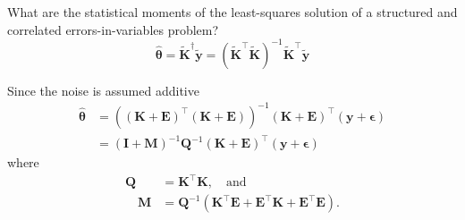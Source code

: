 \documentclass[presentation]{beamer}
\begin{document}
\begin{frame}[label={slide:statistical1}]{What are the statistical moments of the least-squares solution of a structured and correlated errors-in-variables problem?}
\begin{equation*} \widehat{\bm{\theta}} = \widetilde{\mathbf{K}}^\dagger \widetilde{\mathbf{y}} = ( \widetilde{\mathbf{K}}^\top \widetilde{\mathbf{K}} )^{-1} \widetilde{\mathbf{K}}^\top \widetilde{\mathbf{y}} \end{equation*}
\end{frame}

\begin{frame}[label={slide:statistical1_2}]{Since the noise is assumed additive}
\begin{equation*} \begin{aligned} \widehat{\bm{\theta}} &= \left( (\mathbf{K}+\mathbf{E})^\top (\mathbf{K}+\mathbf{E})  \right)^{-1} (\mathbf{K}+\mathbf{E})^\top (\mathbf{y}+\bm{\epsilon}) \\
&= \left( \mathbf{I} + \mathbf{M} \right)^{-1} \mathbf{Q}^{-1} (\mathbf{K}+\mathbf{E})^\top (\mathbf{y}+\bm{\epsilon}) \end{aligned}\end{equation*} 
\linebreak 
where
\begin{equation*} \begin{aligned}  \mathbf{Q} &= \mathbf{K}^\top \mathbf{K}, \quad \text{and} \\
\quad \mathbf{M} &= \mathbf{Q}^{-1} ( \mathbf{K}^\top \mathbf{E} + \mathbf{E}^\top \mathbf{K} + \mathbf{E}^\top \mathbf{E} ). \end{aligned} \end{equation*} 
\end{frame}
\end{document}
